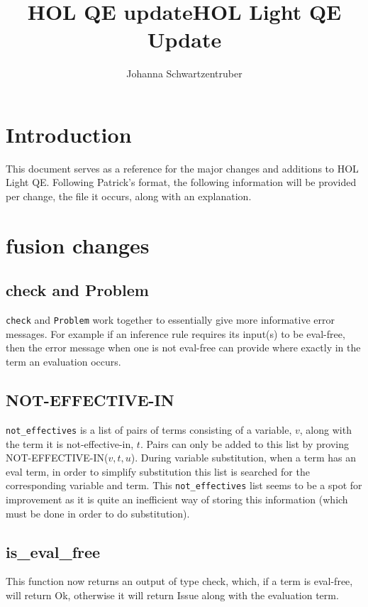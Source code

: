 \documentclass{article}
\title{HOL QE update}
\date{}
\def\c#1{\texttt{#1}}
\begin{document}
\title{HOL Light QE Update}
\author{Johanna Schwartzentruber}

\maketitle
\newpage
\tableofcontents

\newpage
\section{Introduction}
This document serves as a reference for the major changes and additions to HOL Light QE. Following Patrick's format, the following information will be provided per change, the file it occurs, along with an explanation.

\newpage
\section{fusion changes}

\subsection{check and Problem}
\c{check} and \c{Problem} work together to essentially give more informative error messages. For example if an inference rule requires its input(s) to be eval-free, then the error message when one is not eval-free can provide where exactly in the term an evaluation occurs.

\subsection{NOT-EFFECTIVE-IN}
\c{not\_effectives} is a list of pairs of terms consisting of a variable, $v$, along with the term it is not-effective-in, $t$. Pairs can only be added to this list by proving NOT-EFFECTIVE-IN($v,t,u$). During variable substitution, when a term has an eval term, in order to simplify substitution this list is searched for the corresponding variable and term. This \c{not\_effectives} list seems to be a spot for improvement as it is quite an inefficient way of storing this information (which must be done in order to do substitution). 

\subsection{is\_eval\_free}
This function now returns an output of type check, which, if a term is eval-free, will return Ok, otherwise it will return Issue along with the evaluation term. 
\end{document}

